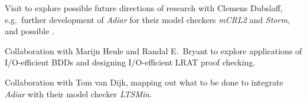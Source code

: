 \begin{itemize}

  Visit to explore possible future directions of research with Clemens Dubslaff,
  e.g.\ further development of \emph{Adiar} for their model checkers \emph{mCRL2}
  and \emph{Storm}, and possible .


  Collaboration with Marijn Heule and Randal E.\ Bryant to explore applications
  of I/O-efficient BDDs and designing I/O-efficient LRAT proof checking.


  Collaboration with Tom van Dijk, mapping out what to be done to integrate
  \emph{Adiar} with their model checker \emph{LTSMin}.
\end{itemize}
